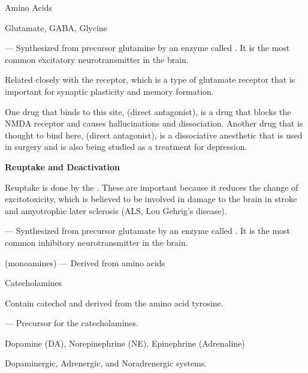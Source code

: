 \begin{coloredlist}
    \item Amino Acids
    \begin{coloredlist}
        \item Glutamate, GABA, Glycine
        \begin{coloredlist}
            \item {} — Synthesized from precursor glutamine by an enzyme called . It is the most common excitatory neurotransmitter in the brain.
            \begin{coloredlist}
                \item Related closely with the  receptor, which is a type of glutamate receptor that is important for synaptic plasticity and memory formation.
                \item One drug that binds to this site,  (direct antagonist), is a drug that blocks the NMDA receptor and causes hallucinations and dissociation. Another drug that is thought to bind here,  (direct antagonist), is a dissociative anesthetic that is used in surgery and is also being studied as a treatment for depression.
                \item \textbf{Reuptake and Deactivation}
                \begin{coloredlist}
                    \item Reuptake is done by the . These are important because it reduces the change of excitotoxicity, which is believed to be involved in damage to the brain in stroke and amyotrophic later sclerosis (ALS, Lou Gehrig's disease).
                \end{coloredlist}
            \end{coloredlist}
            \item {} — Synthesized from precursor glutamate by an enzyme called . It is the most common inhibitory neurotransmitter in the brain.
        \end{coloredlist}
    \end{coloredlist}
    \item {} (monoamines) — Derived from amino acids
    \begin{coloredlist}
        \item Catecholamines
        \begin{coloredlist}
            \item Contain catechol and derived from the amino acid tyrosine.
            \item {} — Precursor for the catecholamines.
            \item Dopamine (DA), Norepinephrine (NE), Epinephrine (Adrenaline)
            \item Dopaminergic, Adrenergic, and Noradrenergic systems.
        \end{coloredlist}


\end{coloredlist}
\end{coloredlist}
